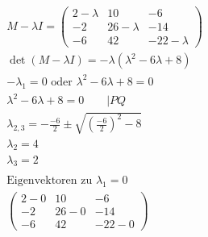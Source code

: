 \begin{align*}
    M - \lambda I = \begin{pmatrix}
                        2 - \lambda & 10           & -6            \\
                        -2          & 26 - \lambda & -14           \\
                        -6          & 42           & -22 - \lambda
                    \end{pmatrix}                  \\
    \det(M - \lambda I) = -\lambda(\lambda^2 - 6\lambda + 8)                    \\
    -\lambda_1 = 0 \text{ oder } \lambda^2 - 6\lambda + 8 = 0                   \\
    \lambda^2 - 6\lambda + 8 = 0 \qquad | PQ                                    \\
    \lambda_{2, 3} = -\frac{-6}{2} \pm \sqrt{{\left(\frac{-6}{2}\right)}^2 - 8} \\
    \lambda_2 = 4                                                               \\
    \lambda_3 = 2                                                               \\\\
    \text{Eigenvektoren zu } \lambda_1 = 0                                      \\
    \begin{pmatrix}
        2 - 0 & 10     & -6    \\
        -2    & 26 - 0 & -14   \\
        -6    & 42     & -22-0
    \end{pmatrix}
\end{align*}


